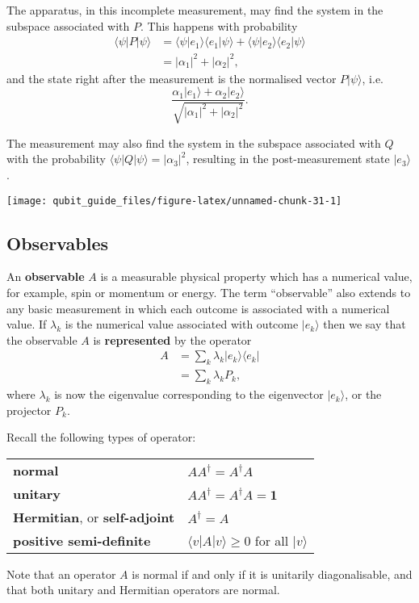 \documentclass[fleqn]{article}
\newenvironment{idea}{\noindent}{\medskip}
\begin{document}
The apparatus, in this incomplete measurement, may find the system in the subspace associated with \(P\).
This happens with probability
\[
  \begin{aligned}
    \langle\psi|P|\psi\rangle
    &= \langle\psi|e_1\rangle \langle e_1|\psi\rangle + \langle\psi|e_2\rangle \langle e_2|\psi\rangle
  \\&= |\alpha_1|^2 + |\alpha_2|^2,
  \end{aligned}
\]
and the state right after the measurement is the normalised vector \(P|\psi\rangle\), i.e.
\[
  \frac{\alpha_1|e_1\rangle+\alpha_2|e_2\rangle}{\sqrt{|\alpha_1|^2 + |\alpha_2|^2}}.
\]

The measurement may also find the system in the subspace associated with \(Q\) with the probability \(\langle\psi|Q|\psi\rangle = |\alpha_3|^2\), resulting in the post-measurement state \(|e_3\rangle\).

\begin{center}\texttt{[image: qubit\_guide\_files/figure-latex/unnamed-chunk-31-1]} \end{center}

\hypertarget{observables}{%
\subsection{Observables}\label{observables}}

An \textbf{observable} \(A\) is a measurable physical property which has a numerical value, for example, spin or momentum or energy.
The term ``observable'' also extends to any basic measurement in which each outcome is associated with a numerical value.
If \(\lambda_k\) is the numerical value associated with outcome \(|e_k\rangle\) then we say that the observable \(A\) is \textbf{represented} by the operator
\[
  \begin{aligned}
    A
    &= \sum_k \lambda_k |e_k\rangle\langle e_k|
  \\&= \sum_k \lambda_k P_k,
  \end{aligned}
\]
where \(\lambda_k\) is now the eigenvalue corresponding to the eigenvector \(|e_k\rangle\), or the projector \(P_k\).

\begin{idea}
Recall the following types of operator:

\begin{longtable}[]{@{}ll@{}}
\toprule
\endhead
\textbf{normal} & \(AA^\dagger = A^\dagger A\)\tabularnewline
\textbf{unitary} & \(AA^\dagger = A^\dagger A = \mathbf{1}\)\tabularnewline
\textbf{Hermitian}, or \textbf{self-adjoint} & \(A^\dagger = A\)\tabularnewline
\textbf{positive semi-definite} & \(\langle v|A|v\rangle\geqslant 0\) for all \(|v\rangle\)\tabularnewline
\bottomrule
\end{longtable}

Note that an operator \(A\) is normal if and only if it is unitarily diagonalisable, and that both unitary and Hermitian operators are normal.

\end{idea}
\end{document}
